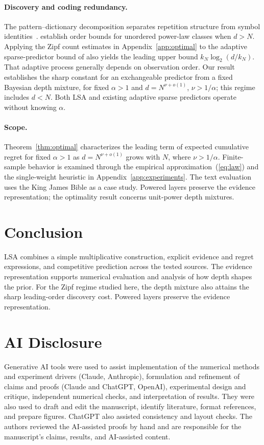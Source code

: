 \documentclass[anon]{alt2027}
\renewcommand{\eqref}[1]{(\ref{#1})}
\begin{document}
\paragraph{Discovery and coding redundancy.}
The pattern--dictionary decomposition separates repetition structure from symbol identities~\citep{orlitsky2004unknown}. \citet{falahatgar2015universal} establish order bounds for unordered power-law classes when $d>N$. Applying the Zipf count estimates in Appendix~\ref{app:optimal} to the adaptive sparse-predictor bound of \citet[Theorem~5]{hutter2013sparse} also yields the leading upper bound $k_N\log_2(d/k_N)$. That adaptive process generally depends on observation order. Our result establishes the sharp constant for an exchangeable predictor from a fixed Bayesian depth mixture, for fixed $\alpha>1$ and $d=N^{\nu+o(1)}$, $\nu>1/\alpha$; this regime includes $d<N$. Both LSA and existing adaptive sparse predictors operate without knowing $\alpha$.

\paragraph{Scope.}
Theorem~\ref{thm:optimal} characterizes the leading term of expected cumulative regret for fixed $\alpha>1$ as $d=N^{\nu+o(1)}$ grows with $N$, where $\nu>1/\alpha$. Finite-sample behavior is examined through the empirical approximation~\eqref{eq:law} and the single-weight heuristic in Appendix~\ref{app:experiments}. The text evaluation uses the King James Bible as a case study. Powered layers preserve the evidence representation; the optimality result concerns unit-power depth mixtures.

\section{Conclusion}
LSA combines a simple multiplicative construction, explicit evidence and regret expressions, and competitive prediction across the tested sources. The evidence representation supports numerical evaluation and analysis of how depth shapes the prior. For the Zipf regime studied here, the depth mixture also attains the sharp leading-order discovery cost. Powered layers preserve the evidence representation.

\clearpage

\section*{AI Disclosure}
Generative AI tools were used to assist implementation of the numerical methods and experiment drivers (Claude, Anthropic), formulation and refinement of claims and proofs (Claude and ChatGPT, OpenAI), experimental design and critique, independent numerical checks, and interpretation of results. They were also used to draft and edit the manuscript, identify literature, format references, and prepare figures. ChatGPT also assisted consistency and layout checks. The authors reviewed the AI-assisted proofs by hand and are responsible for the manuscript's claims, results, and AI-assisted content.
\end{document}
